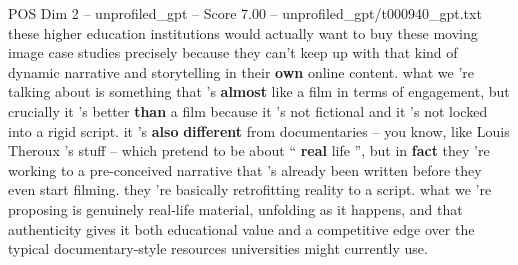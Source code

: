 \begin{textsample}{POS Dim 2 – unprofiled\_gpt – Score 7.00 – unprofiled\_gpt/t000940\_gpt.txt}  \label{ex:f2_pos_026}
these higher education institutions would actually want to buy these moving image case studies precisely because they can't keep up with that kind of dynamic narrative and storytelling in their \textbf{own} online content. what we ’re talking about is something that ’s \textbf{almost} like a film in terms of engagement, but crucially it ’s better \textbf{than} a film because it ’s not fictional and it ’s not locked into a rigid script. it ’s \textbf{also} \textbf{different} from documentaries – you know, like Louis Theroux ’s stuff – which pretend to be about “ \textbf{real} life ”, but in \textbf{fact} they ’re working to a pre-conceived narrative that ’s already been written before they even start filming. they ’re basically retrofitting reality to a script. what we ’re proposing is genuinely real-life material, unfolding as it happens, and that authenticity gives it both educational value and a competitive edge over the typical documentary-style resources universities might currently use.

\end{textsample}
